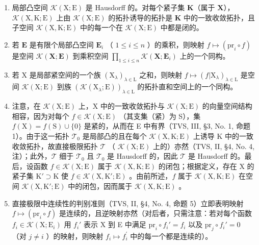 \begin{enumerate}
\def\labelenumi{(\roman{enumi})}
\item
  局部凸空间 \(\mathcal{K}(\mathrm{X};\mathrm{E})\) 是 Hausdorff 的。对每个紧子集 \(\mathbf{K}\)（属于 \(\mathbf{X}\)），\(\mathcal{K}(\mathrm{X},\mathrm{K};\mathrm{E})\) 上由 \(\mathcal{K}(\mathrm{X};\mathrm{E})\) 的拓扑诱导的拓扑是 \(\mathbf{K}\) 中的一致收敛拓扑，且子空间 \(\mathcal{K}(\mathrm{X},\mathrm{K};\mathrm{E})\) 中的每一个在 \(\mathcal{K}(\mathrm{X};\mathrm{E})\) 中都是闭的。
\item
  若 \(\mathbf{E}\) 是有限个局部凸空间 \(\mathbf{E}_i\) （ \(1 \leqslant i \leqslant n\) ）的乘积，则映射 \(f \mapsto (\mathrm{pr}_i \circ f)\) 是空间 \(\mathcal{K}(\mathbf{X};\mathbf{E})\) 到乘积空间 \(\prod_{1 \leqslant i \leqslant n} \mathcal{K}(\mathbf{X};\mathbf{E}_i)\) 上的一个同构。
\item
  若 \(\mathrm{X}\) 是局部紧空间的一个族 \((\mathrm{X}_{\lambda})_{\lambda \in \mathrm{L}}\) 之和，则映射 \(f \mapsto (f|\mathrm{X}_{\lambda})_{\lambda \in \mathrm{L}}\) 是空间 \(\mathcal{K}(\mathrm{X};\mathrm{E})\) 到族 \((\mathcal{K}(\mathrm{X}_{\lambda};\mathrm{E}))_{\lambda \in \mathrm{L}}\) 的拓扑直和空间上的一个同构。
\item
  注意，在 \(\mathcal{K}(\mathrm{X};\mathrm{E})\) 上，X 中的一致收敛拓扑与 \(\mathcal{K}(\mathrm{X};\mathrm{E})\) 的向量空间结构相容，因为对每个 \(f\in \mathcal{K}(\mathrm{X};\mathrm{E})\) （其支集（紧）为 S），集 \(f(\mathrm{X}) = f(\mathrm{S})\cup \{0\}\) 是紧的，从而在 E 中有界（TVS, III, §3, No. 1, 命题 1）。由于这一拓扑 \(\mathcal{T}_0\) 是局部凸的且在每个 \(\mathcal{K}(\mathrm{X},\mathrm{K};\mathrm{E})\) 上诱导 K 中的一致收敛拓扑，故直接极限拓扑 \(\mathcal{T}\) （ \(\mathcal{K}(\mathrm{X};\mathrm{E})\) 上的）亦然（TVS, II, §4, No. 4, 注）；此外，\(\mathcal{T}\) 细于 \(\mathcal{T}_0\) 且 \(\mathcal{T}_0\) 是 Hausdorff 的，因此 \(\mathcal{T}\) 是 Hausdorff 的。最后，设函数 \(f\in \mathcal{K}(\mathrm{X};\mathrm{E})\) 属于 \(\mathcal{K}(\mathrm{X},\mathrm{K};\mathrm{E})\) 的闭包；根据定义，存在 X 的紧子集 \(\mathrm{K}'\supset \mathrm{K}\) 使 \(f\in \mathcal{K}(\mathrm{X},\mathrm{K}';\mathrm{E})\) 。由前所述，\(f\) 属于 \(\mathcal{K}(\mathrm{X},\mathrm{K};\mathrm{E})\) 在空间 \(\mathcal{K}(\mathrm{X},\mathrm{K}';\mathrm{E})\) 中的闭包，因而属于 \(\mathcal{K}(\mathrm{X},\mathrm{K};\mathrm{E})\) 。
\item
  直接极限中连续性的判别准则（TVS, II, §4, No. 4, 命题 5）立即表明映射 \(f \mapsto (\mathrm{pr}_i \circ f)\) 是连续的，且逆映射亦然（对后者，只需注意：若对每个函数 \(f_i \in \mathcal{K}(\mathrm{X};\mathrm{E}_i)\) 用 \(f_i'\) 表示 X 到 E 中满足 \(\mathrm{pr}_i\circ f_i' = f_i\) 以及 \(\mathrm{pr}_j\circ f_i' = 0\) （对 \(j\neq i\) ）的映射，则映射 \(f_{i}\mapsto f_{i}^{\prime}\) 中的每一个都是连续的）。

\end{enumerate}

